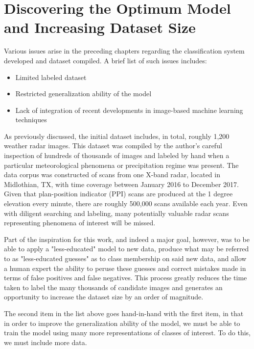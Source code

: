 \chapter{Discovering the Optimum Model and Increasing Dataset Size}
\label{sec:bestmodel}

Various issues arise in the preceding chapters regarding the classification system developed and dataset compiled.
A brief list of such issues includes:

\begin{itemize}
	\item Limited labeled dataset
	\item Restricted generalization ability of the model
	\item Lack of integration of recent developments in image-based machine learning techniques
\end{itemize}

As previously discussed, the initial dataset includes, in total, roughly 1,200 weather radar images.
This dataset was compiled by the author's careful inspection of hundreds of thousands of images and labeled by hand when a particular meteorological phenomena or precipitation regime was present.
The data corpus was constructed of scans from one X-band radar, located in Midlothian, TX, with time coverage between January 2016 to December 2017.
Given that plan-position indicator (PPI) scans are produced at the 1 degree elevation every minute, there are roughly 500,000 scans available each year.
Even with diligent searching and labeling, many potentially valuable radar scans representing phenomena of interest will be missed.

Part of the inspiration for this work, and indeed a major goal, however, was to be able to apply a "less-educated" model to new data, produce what may be referred to as "less-educated guesses" as to class membership on said new data, and allow a human expert the ability to peruse these guesses and correct mistakes made in terms of false positives and false negatives.
This process greatly reduces the time taken to label the many thousands of candidate images and generates an opportunity to increase the dataset size by an order of magnitude.

The second item in the list above goes hand-in-hand with the first item, in that in order to improve the generalization ability of the model, we must be able to train the model using many more representations of classes of interest.
To do this, we must include more data.

